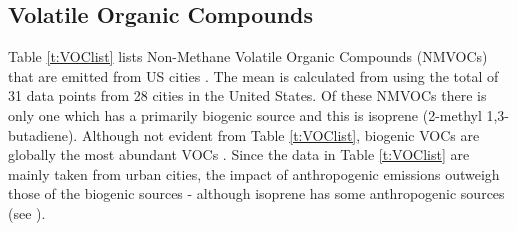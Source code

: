 \subsection{Volatile Organic Compounds}
Table \ref{t:VOClist} lists Non-Methane Volatile Organic Compounds (NMVOCs) that are emitted from US cities \citep{Baker:2008}. 
The mean is calculated from \citep{Baker:2008} using the total of 31 data points from 28 cities in the United States. Of these 
NMVOCs there is only one which has a primarily biogenic source and this is isoprene (2-methyl 1,3-butadiene). Although not 
evident from Table \ref{t:VOClist}, biogenic VOCs are globally the most abundant VOCs \citep{Goldstein:2007}. Since the data in 
Table \ref{t:VOClist} are mainly taken from urban cities, the impact of anthropogenic emissions outweigh those of the biogenic 
sources \citep{Baker:2008} - although isoprene has some anthropogenic sources (see \citep{Borbon:2003}). 
